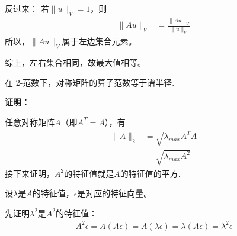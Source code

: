 \documentclass{article}
\begin{document}
反过来：
若$\|u\|_V = 1$，则
\begin{align*}
  \big\| A u\big\|_V & = \frac{\|Au\|_V}{\|u\|_V}
\end{align*}
所以，$\big\| A u\big\|_V$属于左边集合元素。

综上，左右集合相同，故最大值相等。

\begin{zremark}
  在 2-范数下，对称矩阵的算子范数等于谱半径.
\end{zremark}

\textbf{证明：}

任意对称矩阵$A$（即$A^T = A$），有
\begin{align*}
  \| A \|_2
   & = \sqrt{\lambda_{max}A^T A} \\
   & = \sqrt{\lambda_{max}A^2}
\end{align*}
接下来证明，$A^2$的特征值就是$A$的特征值的平方.

设$\lambda$是$A$的特征值，$\epsilon$是对应的特征向量。

先证明$\lambda^2$是$A^2$的特征值：
\begin{align*}
  A^2 \epsilon = A (A \epsilon) = A (\lambda \epsilon) = \lambda (A \epsilon) = \lambda^2 \epsilon
\end{align*}
\end{document}
